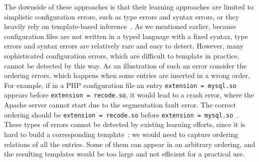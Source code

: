 The downside of these approaches is that their learning approaches 
are limited to simplistic configuration errors, 
such as type errors and syntax errors, or they 
heavily rely on template-based inference~\cite{zhang14encore}. 
As we mentioned earlier, 
because configuration files are not written in a typed language 
with a fixed syntax,
type errors and syntax errors are relatively rare and easy to detect. 
However, many sophisticated configuration errors, 
which are difficult to template in practice, 
cannot be detected by this way. 
As an illustration of such an error consider the ordering errors, 
which happens when some entries are inserted in a wrong order. 
For example, if in a PHP configuration file 
an entry {\tt extension = mysql.so} appears 
before {\tt extension = recode.so},  
it would lead to a crash error, where the Apache server cannot start 
due to the segmentation fault error. The correct ordering 
should be {\tt extension = recode.so} before 
{\tt extension = mysql.so}~\cite{yin11anempirical}.
These types of errors cannot be detected by existing
learning efforts, 
since it is hard to build a corresponding template~\cite{xu15systems}: 
we would need to capture ordering relations of all the entries. 
Some of them can appear in an arbitrary ordering, 
and the resulting templates would be too large 
and not efficient for a practical use.



